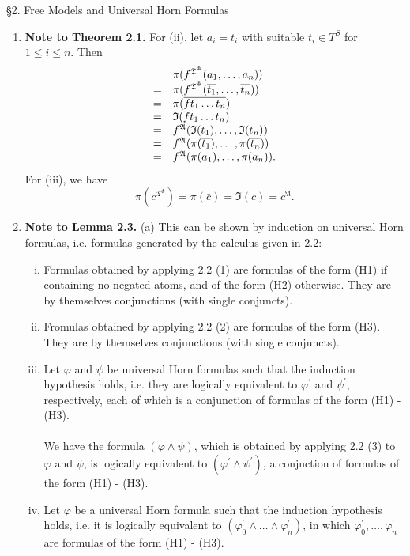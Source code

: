 \
\\
\\
{\large \S2. Free Models and Universal Horn Formulas}
\begin{enumerate}[1.]
\item \textbf{Note to Theorem 2.1.} For (ii), let $a_i = \overline{t_i}$ with suitable $t_i \in T^S$ for $1 \leq i \leq n$. Then
\[
\begin{array}{ll}
\ & \pi (f^{\mathfrak{T}^\Phi}(a_1, \ldots, a_n)) \cr
= & \pi (f^{\mathfrak{T}^\Phi}(\overline{t_1}, \ldots, \overline{t_n})) \cr
= & \pi (\overline{ft_1 \ldots t_n}) \cr
= & \mathfrak{I}(ft_1 \ldots t_n) \cr
= & f^\mathfrak{A} (\mathfrak{I}(t_1), \ldots, \mathfrak{I}(t_n)) \cr
= & f^\mathfrak{A} (\pi (\overline{t_1}), \ldots, \pi (\overline{t_n})) \cr
= & f^\mathfrak{A} (\pi (a_1), \ldots, \pi (a_n)).
\end{array}
\]
For (iii), we have
\[
\pi (c^{\mathfrak{T}^\Phi}) = \pi (\bar{c}) = \mathfrak{I}(c) = c^\mathfrak{A}.
\]
%
\item \textbf{Note to Lemma 2.3.} (a) This can be shown by induction on universal Horn formulas, i.e. formulas generated by the calculus given in 2.2:
\begin{enumerate}[(i)]
\item Formulas obtained by applying 2.2 (1) are formulas of the form (H1) if containing no negated atoms, and of the form (H2) otherwise. They are by themselves conjunctions (with single conjuncts).
\item Fromulas obtained by applying 2.2 (2) are formulas of the form (H3). They are by themselves conjunctions (with single conjuncts).
\item Let $\varphi$ and $\psi$ be universal Horn formulas such that the induction hypothesis holds, i.e. they are logically equivalent to $\varphi^\prime$ and $\psi^\prime$, respectively, each of which is a conjunction of formulas of the form (H1) - (H3).\\
\ \\
We have the formula $(\varphi \land \psi)$, which is obtained by applying 2.2 (3) to $\varphi$ and $\psi$, is logically equivalent to $(\varphi^\prime \land \psi^\prime)$, a conjuction of formulas of the form (H1) - (H3).
\item Let $\varphi$ be a universal Horn formula such that the induction hypothesis holds, i.e. it is logically equivalent to $(\varphi_0^\prime \land \ldots \land \varphi_n^\prime)$, in which $\varphi_0^\prime, \ldots, \varphi_n^\prime$ are formulas of the form (H1) - (H3).\\

\end{enumerate}
\end{enumerate}
